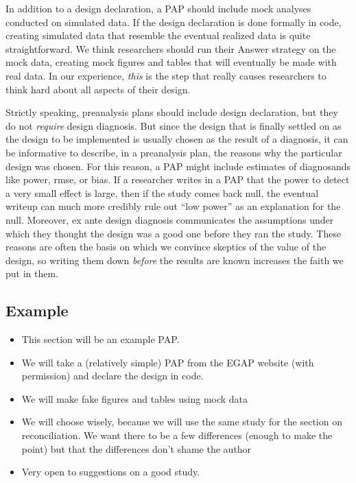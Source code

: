 \documentclass[
]{article}
\providecommand{\tightlist}{%
  \setlength{\itemsep}{0pt}\setlength{\parskip}{0pt}}
\begin{document}
In addition to a design declaration, a PAP should include mock analyses
conducted on simulated data. If the design declaration is done formally
in code, creating simulated data that resemble the eventual realized
data is quite straightforward. We think researchers should run their
Answer strategy on the mock data, creating mock figures and tables that
will eventually be made with real data. In our experience, \emph{this}
is the step that really causes researchers to think hard about all
aspects of their design.

Strictly speaking, preanalysis plans should include design declaration,
but they do not \emph{require} design diagnosis. But since the design
that is finally settled on as the design to be implemented is usually
chosen as the result of a diagnosis, it can be informative to describe,
in a preanalysis plan, the reasons why the particular design was chosen.
For this reason, a PAP might include estimates of diagnosands like
power, rmse, or bias. If a researcher writes in a PAP that the power to
detect a very small effect is large, then if the study comes back null,
the eventual writeup can much more credibly rule out ``low power'' as an
explanation for the null. Moreover, ex ante design diagnosis
communicates the assumptions under which they thought the design was a
good one before they ran the study. These reasons are often the basis on
which we convince skeptics of the value of the design, so writing them
down \emph{before} the results are known increases the faith we put in
them.

\hypertarget{example}{%
\subsection{Example}\label{example}}

\begin{itemize}
\tightlist
\item
  This section will be an example PAP.
\item
  We will take a (relatively simple) PAP from the EGAP website (with
  permission) and declare the design in code.
\item
  We will make fake figures and tables using mock data
\item
  We will choose wisely, because we will use the same study for the
  section on reconciliation. We want there to be a few differences
  (enough to make the point) but that the differences don't shame the
  author
\item
  Very open to suggestions on a good study.
\end{itemize}
\end{document}
